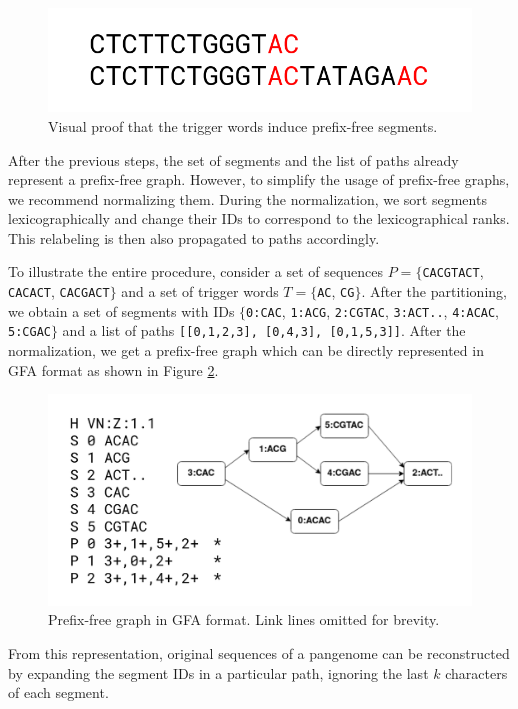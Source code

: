 \begin{figure}
    \centering
    \includegraphics[width=\linewidth]{images/prefixfree_proof.png}
    \caption{Visual proof that the trigger words induce prefix-free segments.}
    \label{fig:proof}
\end{figure}

After the previous steps, the set of segments and the list of paths already represent a prefix-free graph.
However, to simplify the usage of prefix-free graphs, we recommend normalizing them.
During the normalization, we sort segments lexicographically and change their IDs to correspond to the lexicographical ranks.
This relabeling is then also propagated to paths accordingly. 

To illustrate the entire procedure, consider a set of sequences $P = \{$\texttt{CACGTACT}, \texttt{CACACT}, \texttt{CACGACT}$\}$ and a set of trigger words $T = \{$\texttt{AC}, \texttt{CG}$\}$.
After the partitioning, we obtain a set of segments with IDs $\{$\texttt{0:CAC}, \texttt{1:ACG}, \texttt{2:CGTAC}, \texttt{3:ACT..}, \texttt{4:ACAC}, \texttt{5:CGAC}$\}$ and a list of paths \texttt{[[0,1,2,3], [0,4,3], [0,1,5,3]]}.
After the normalization, we get a prefix-free graph which can be directly represented in GFA format as shown in Figure \ref{fig:gfa}.

\begin{figure}
    \centering
    \includegraphics[width=\linewidth]{images/pfg_gfa.v3.png}
    \caption{Prefix-free graph in GFA format. Link lines omitted for brevity.}
    \label{fig:gfa}
\end{figure}

From this representation, original sequences of a pangenome can be reconstructed by expanding the segment IDs in a particular path, ignoring the last $k$ characters of each segment.

